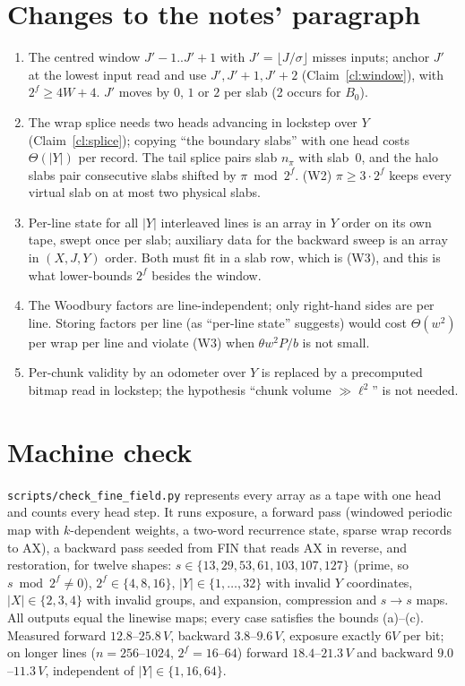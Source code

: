 \documentclass[11pt]{article}
\theoremstyle{definition}\newtheorem{definition}{Definition}
\theoremstyle{remark}\newtheorem*{remark}{Remark}
\begin{document}
\section{Changes to the notes' paragraph}
\begin{enumerate}
\item The centred window $J'-1..J'+1$ with $J'=\lfloor J/\sigma\rfloor$ misses inputs; anchor
$J'$ at the lowest input read and use $J',J'+1,J'+2$ (Claim~\ref{cl:window}), with
$2^f\ge4W+4$. $J'$ moves by $0$, $1$ or $2$ per slab (2 occurs for $B_0$).
\item The wrap splice needs two heads advancing in lockstep over $Y$ (Claim~\ref{cl:splice});
copying ``the boundary slabs'' with one head costs $\Theta(|Y|)$ per record. The tail splice
pairs slab $n_\pi$ with slab~$0$, and the halo slabs pair consecutive slabs shifted by
$\pi\bmod2^f$. (W2) $\pi\ge3\cdot2^f$ keeps every virtual slab on at most two physical slabs.
\item Per-line state for all $|Y|$ interleaved lines is an array in $Y$ order on its own tape,
swept once per slab; auxiliary data for the backward sweep is an array in $(X,J,Y)$ order. Both
must fit in a slab row, which is (W3), and this is what lower-bounds $2^f$ besides the window.
\item The Woodbury factors are line-independent; only right-hand sides are per line. Storing
factors per line (as ``per-line state'' suggests) would cost $\Theta(w^2)$ per wrap per line and
violate (W3) when $\theta w^2P/b$ is not small.
\item Per-chunk validity by an odometer over $Y$ is replaced by a precomputed bitmap read in
lockstep; the hypothesis ``chunk volume $\gg\ell^2$'' is not needed.
\end{enumerate}

\section{Machine check}
\texttt{scripts/check\_fine\_field.py} represents every array as a tape with one head and counts every head
step. It runs exposure, a forward pass (windowed periodic map with $k$-dependent weights, a
two-word recurrence state, sparse wrap records to AX), a backward pass seeded from FIN that
reads AX in reverse, and restoration, for twelve shapes: $s\in\{13,29,53,61,103,107,127\}$
(prime, so $s\bmod2^f\ne0$), $2^f\in\{4,8,16\}$, $|Y|\in\{1,\dots,32\}$ with invalid $Y$
coordinates, $|X|\in\{2,3,4\}$ with invalid groups, and expansion, compression and $s\to s$
maps. All outputs equal the linewise maps; every case satisfies the bounds (a)--(c). Measured
forward $12.8$--$25.8\,V$, backward $3.8$--$9.6\,V$, exposure exactly $6V$ per bit; on longer
lines ($n=256$--$1024$, $2^f=16$--$64$) forward $18.4$--$21.3\,V$ and backward $9.0$--$11.3\,V$,
independent of $|Y|\in\{1,16,64\}$.
\end{document}
